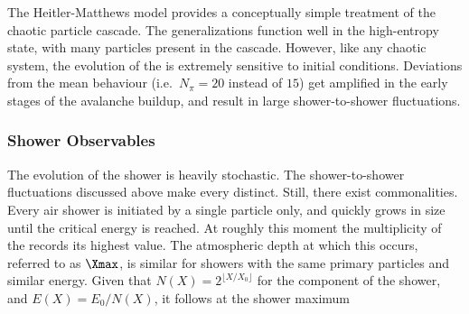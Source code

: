 The Heitler-Matthews model provides a conceptually simple treatment of the 
chaotic particle cascade. The generalizations function well in the high-entropy
state, with many particles present in the cascade. However, like any chaotic 
system, the evolution of the \EAS is extremely sensitive to initial conditions.
Deviations from the mean behaviour (i.e.\ $N_\pi = 20$ instead of $15$) get 
amplified in the early stages of the avalanche buildup, and result in large 
shower-to-shower fluctuations.

\subsubsection{Shower Observables}

The evolution of the shower is heavily stochastic. The shower-to-shower 
fluctuations discussed above make every \EAS distinct. Still, there exist 
commonalities. Every air shower is initiated by a single particle only, and 
quickly grows in size until the critical energy is reached. At roughly this 
moment the multiplicity of the \EAS records its highest value. The atmospheric 
depth at which this occurs, referred to as $\Xmax$, is similar for showers with
the same primary particles and similar energy. Given that 
$N(X) = 2^{\lfloor X/X_0 \rfloor}$ for the \EM component of the shower, and 
$E(X) = E_0 / N(X)$, it follows at the shower maximum 



